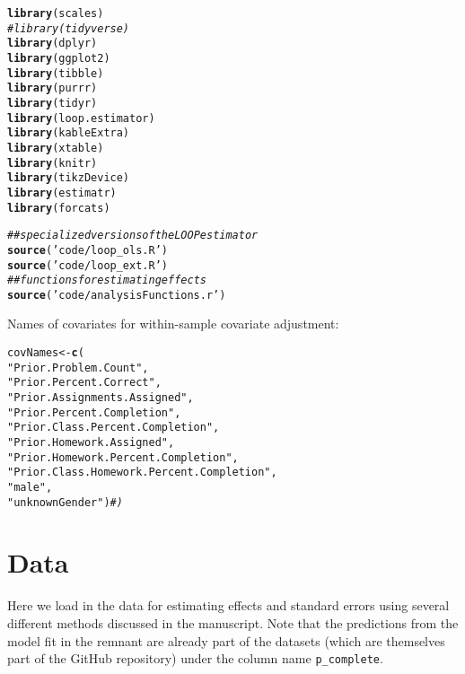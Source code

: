 \documentclass[12pt]{article}\usepackage[]{graphicx}\usepackage[]{xcolor}
\makeatletter
\newcommand{\hlstr}[1]{\textcolor[rgb]{0.192,0.494,0.8}{#1}}%
\newcommand{\hlcom}[1]{\textcolor[rgb]{0.678,0.584,0.686}{\textit{#1}}}%
\newcommand{\hlstd}[1]{\textcolor[rgb]{0.345,0.345,0.345}{#1}}%
\newcommand{\hlkwb}[1]{\textcolor[rgb]{0.69,0.353,0.396}{#1}}%
\newcommand{\hlkwd}[1]{\textcolor[rgb]{0.737,0.353,0.396}{\textbf{#1}}}%
\newenvironment{kframe}{%
 \def\at@end@of@kframe{}%
 \ifinner\ifhmode%
  \def\at@end@of@kframe{\end{minipage}}%
  \begin{minipage}{\columnwidth}%
 \fi\fi%
 \def\FrameCommand##1{\hskip\@totalleftmargin \hskip-\fboxsep
 \colorbox{shadecolor}{##1}\hskip-\fboxsep
     \hskip-\linewidth \hskip-\@totalleftmargin \hskip\columnwidth}%
 \MakeFramed {\advance\hsize-\width
   \@totalleftmargin\z@ \linewidth\hsize
   \@setminipage}}%
 {\par\unskip\endMakeFramed%
 \at@end@of@kframe}
\newenvironment{knitrout}{}{} %
\makeatother
\begin{document}
\begin{knitrout}
\color{fgcolor}\begin{kframe}
\begin{alltt}
\hlkwd{library}\hlstd{(scales)}
\hlcom{#library(tidyverse)}
\hlkwd{library}\hlstd{(dplyr)}
\hlkwd{library}\hlstd{(ggplot2)}
\hlkwd{library}\hlstd{(tibble)}
\hlkwd{library}\hlstd{(purrr)}
\hlkwd{library}\hlstd{(tidyr)}
\hlkwd{library}\hlstd{(loop.estimator)}
\hlkwd{library}\hlstd{(kableExtra)}
\hlkwd{library}\hlstd{(xtable)}
\hlkwd{library}\hlstd{(knitr)}
\hlkwd{library}\hlstd{(tikzDevice)}
\hlkwd{library}\hlstd{(estimatr)}
\hlkwd{library}\hlstd{(forcats)}


\hlcom{## specialized versions of the LOOP estimator}
\hlkwd{source}\hlstd{(}\hlstr{'code/loop_ols.R'}\hlstd{)}
\hlkwd{source}\hlstd{(}\hlstr{'code/loop_ext.R'}\hlstd{)}
\hlcom{## functions for estimating effects}
\hlkwd{source}\hlstd{(}\hlstr{'code/analysisFunctions.r'}\hlstd{)}
\end{alltt}
\end{kframe}
\end{knitrout}

Names of covariates for within-sample covariate adjustment:
\begin{knitrout}
\color{fgcolor}\begin{kframe}
\begin{alltt}
\hlstd{covNames} \hlkwb{<-} \hlkwd{c}\hlstd{(}
    \hlstr{"Prior.Problem.Count"}\hlstd{,}
    \hlstr{"Prior.Percent.Correct"}\hlstd{,}
    \hlstr{"Prior.Assignments.Assigned"}\hlstd{,}
    \hlstr{"Prior.Percent.Completion"}\hlstd{,}
    \hlstr{"Prior.Class.Percent.Completion"}\hlstd{,}
    \hlstr{"Prior.Homework.Assigned"}\hlstd{,}
    \hlstr{"Prior.Homework.Percent.Completion"}\hlstd{,}
    \hlstr{"Prior.Class.Homework.Percent.Completion"}\hlstd{,}
    \hlstr{"male"}\hlstd{,}
    \hlstr{"unknownGender"}\hlstd{)}\hlcom{#)}
\end{alltt}
\end{kframe}
\end{knitrout}

\section{Data}

Here we load in the data for estimating effects and standard errors
using several different methods discussed in the manuscript.
Note that the predictions from the model fit in the remnant are
already part of the datasets (which are themselves part of the GitHub
repository) under the column name \texttt{p\_complete}.
\end{document}
